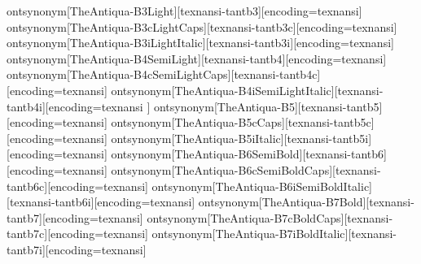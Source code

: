 
\stoptypescript



\stoptypescript


ontsynonym[TheAntiqua-B3Light][texnansi-tantb3][encoding=texnansi]
ontsynonym[TheAntiqua-B3cLightCaps][texnansi-tantb3c][encoding=texnansi]
ontsynonym[TheAntiqua-B3iLightItalic][texnansi-tantb3i][encoding=texnansi]
ontsynonym[TheAntiqua-B4SemiLight][texnansi-tantb4][encoding=texnansi]
ontsynonym[TheAntiqua-B4cSemiLightCaps][texnansi-tantb4c][encoding=texnansi]
ontsynonym[TheAntiqua-B4iSemiLightItalic][texnansi-tantb4i][encoding=texnansi
]
ontsynonym[TheAntiqua-B5][texnansi-tantb5][encoding=texnansi]
ontsynonym[TheAntiqua-B5cCaps][texnansi-tantb5c][encoding=texnansi]
ontsynonym[TheAntiqua-B5iItalic][texnansi-tantb5i][encoding=texnansi]
ontsynonym[TheAntiqua-B6SemiBold][texnansi-tantb6][encoding=texnansi]
ontsynonym[TheAntiqua-B6cSemiBoldCaps][texnansi-tantb6c][encoding=texnansi]
ontsynonym[TheAntiqua-B6iSemiBoldItalic][texnansi-tantb6i][encoding=texnansi]
ontsynonym[TheAntiqua-B7Bold][texnansi-tantb7][encoding=texnansi]
ontsynonym[TheAntiqua-B7cBoldCaps][texnansi-tantb7c][encoding=texnansi]
ontsynonym[TheAntiqua-B7iBoldItalic][texnansi-tantb7i][encoding=texnansi]
